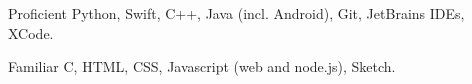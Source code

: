 
\begin{cvskills}

	\cvskill
	{Proficient} %
	{Python, Swift, C++, Java (incl. Android), Git, JetBrains IDEs, XCode.} %

	\cvskill
	{Familiar} %
	{C, HTML, CSS, Javascript (web and node.js), Sketch.} %


    

\end{cvskills}
